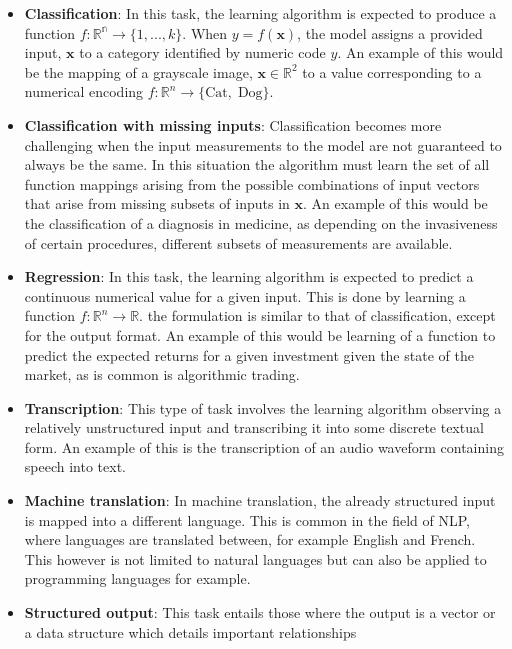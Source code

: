 \begin{itemize}
    \item \textbf{Classification}: In this task, the learning algorithm is
    expected to produce a function $f: \mathbb{R^n}\rightarrow
    \{1,...,k\}$. When $y=f(\mathbf{x})$, the model assigns a provided
    input, $\mathbf{x}$ to a category identified by numeric code $y$. An
    example of this would be the mapping of a grayscale image,
    $\mathbf{x}\in\mathbb{R}^2$ to a value corresponding to a numerical
    encoding $f:\mathbb{R}^n\rightarrow\{\textrm{Cat},\;\textrm{Dog}\}$.
    \item \textbf{Classification with missing inputs}: Classification becomes
    more challenging when the input measurements to the model are not
    guaranteed to always be the same. In this situation the algorithm must
    learn the set of all function mappings arising from the possible
    combinations of input vectors that arise from missing subsets of
    inputs in $\mathbf{x}$. An example of this would be the classification
    of a diagnosis in medicine, as depending on the invasiveness of
    certain procedures, different subsets of measurements are available.
    \item \textbf{Regression}: In this task, the learning algorithm is expected
    to predict a continuous numerical value for a given input. This is
    done by learning a function $f: \mathbb{R}^n\rightarrow\mathbb{R}$.
    the formulation is similar to that of classification, except for the
    output format. An example of this would be learning of a function to
    predict the expected returns for a given investment given the state of
    the market, as is common is algorithmic trading.
    \item \textbf{Transcription}: This type of task involves the learning
    algorithm observing a relatively unstructured input and transcribing
    it into some discrete textual form. An example of this is the
    transcription of an audio waveform containing speech into text.
    \item \textbf{Machine translation}: In machine translation, the already
    structured input is mapped into a different language. This is common
    in the field of \gls{NLP}, where languages are translated between, for
    example English and French. This however is not limited to natural
    languages but can also be applied to programming languages for
    example.
    \item \textbf{Structured output}: This task entails those where the output
    is a vector or a data structure which details important relationships

\end{itemize}
